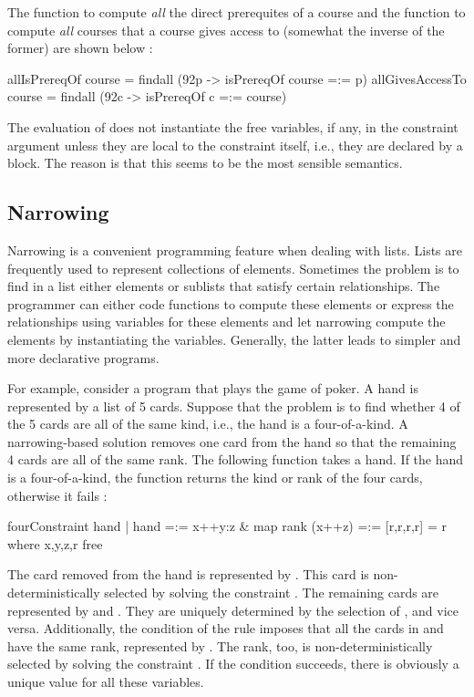 The function to compute \emph{all} the direct prerequites
of a course and the function to compute \emph{all} courses that
a course gives access to (somewhat the inverse of the former)
are shown below
:
%
\begin{prog}
allIsPrereqOf     course = findall (\char92p -> isPrereqOf course =:= p)
allGivesAccessTo  course = findall (\char92c -> isPrereqOf c =:= course)
\end{prog}
%
The evaluation of  does not instantiate
the free variables, if any, in the constraint argument
unless they are local to the constraint itself,
i.e., they are declared by a  block.
The reason is that this seems to be the most sensible semantics.


\subsection{Narrowing}

Narrowing is a convenient programming feature when dealing with lists.
Lists are frequently used to represent collections of elements.
Sometimes the problem is to find in a list either elements
or sublists that satisfy certain relationships.
The programmer can either code functions to compute these elements
or express the relationships using variables for these elements
and let narrowing compute the elements by instantiating the variables.
Generally, the latter leads to simpler and more declarative programs.

For example, consider a program that plays the game of poker.
A hand is represented by a list of 5 cards.
Suppose that the problem is to find whether 4 of the 5 cards
are all of the same kind, i.e., the hand is a four-of-a-kind.
A narrowing-based solution removes one card from the hand
so that the remaining 4 cards are all of the same rank.
The following function takes a hand.
If the hand is a four-of-a-kind, the function returns the kind or rank
of the four cards, otherwise it fails
:
%
\begin{prog}
fourConstraint hand | hand =:= x++y:z \& map rank (x++z) =:= [r,r,r,r]
                    = r
                    where x,y,z,r free
\end{prog}
%
The card removed from the hand is represented by .
This card is non-deterministically selected by solving
the constraint .
The remaining cards are represented by  and .
They are uniquely determined by the selection of ,
and vice versa.
Additionally, the condition of the rule imposes that
all the cards in  and 
have the same rank, represented by .
The rank, too, is non-deterministically selected by solving
the constraint .
If the condition succeeds, there is obviously a unique
value for all these variables.

